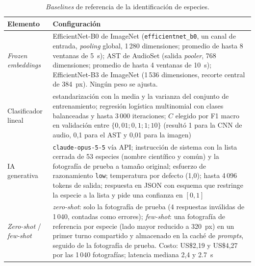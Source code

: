 \begin{table}[H]
  \centering\small
  \caption{\textit{Baselines} de referencia de la identificación de especies.}
  \label{tab:hp-baselines}
  \begin{tabularx}{\textwidth}{@{}>{\raggedright\arraybackslash}p{3.1cm} X@{}}
    \toprule
    Elemento & Configuración \\
    \midrule
    \textit{Frozen embeddings} & EfficientNet-B0 de ImageNet (\texttt{efficientnet\_b0}, un canal de entrada, \textit{pooling} global, 1\,280 dimensiones; promedio de hasta 8 ventanas de \SI{5}{\second}); AST de AudioSet (salida \textit{pooler}, 768 dimensiones; promedio de hasta 4 ventanas de \SI{10}{\second}); EfficientNet-B3 de ImageNet (1\,536 dimensiones, recorte central de \SI{384}{px}). Ningún peso se ajusta. \\
    Clasificador lineal & estandarización con la media y la varianza del conjunto de entrenamiento; regresión logística multinomial con clases balanceadas y hasta 3\,000 iteraciones; $C$ elegido por F1 macro en validación entre $\{0{,}01; 0{,}1; 1; 10\}$ (resultó 1 para la CNN de audio, 0,1 para el AST y 0,01 para la imagen) \\
    \midrule
    IA generativa & \texttt{claude-opus-5-5} vía API; instrucción de sistema con la lista cerrada de 53 especies (nombre científico y común) y la fotografía de prueba a tamaño original; esfuerzo de razonamiento \texttt{low}; temperatura por defecto (1,0); hasta 4\,096 tokens de salida; respuesta en JSON con esquema que restringe la especie a la lista y pide una confianza en $[0, 1]$ \\
    \textit{Zero-shot} / \textit{few-shot} & \textit{zero-shot}: solo la fotografía de prueba (4 respuestas inválidas de 1\,040, contadas como errores); \textit{few-shot}: una fotografía de referencia por especie (lado mayor reducido a \SI{320}{px}) en un primer turno compartido y almacenado en la caché de \textit{prompts}, seguido de la fotografía de prueba. Costo: US\$2,19 y US\$4,27 por las 1\,040 fotografías; latencia mediana 2,4 y \SI{2,7}{\second} \\
    \bottomrule
  \end{tabularx}
\end{table}
